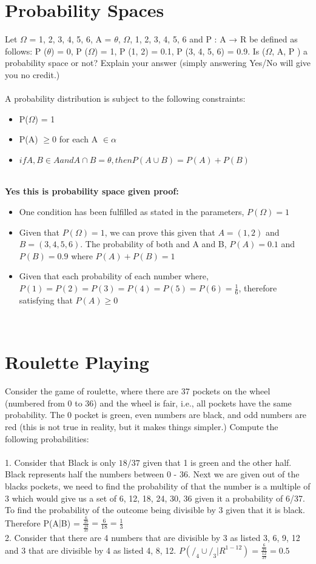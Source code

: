 \documentclass[12pt,letterpaper]{article}
\begin{document}
\section{Probability Spaces}
Let $\Omega$ = {1, 2, 3, 4, 5, 6}, A = {$\theta$, $\Omega$, {1, 2}, {3, 4, 5, 6}} and P : A → R be defined as follows:
P ($\theta$) = 0, P ($\Omega$) = 1, P ({1, 2}) = 0.1, P ({3, 4, 5, 6}) = 0.9. Is ($\Omega$, A, P ) a probability space or not?
Explain your answer (simply answering Yes/No will give you no credit.)
\\
\\
A probability distribution is subject to the following constraints:
\begin{itemize}
    \item P($\Omega$) = 1
    \item P(A) $\ge 0$ for each A $\in \alpha$
    \item $if A, B \in A and A \cap B = \theta, then P(A \cup B) = P(A) + P(B)$
\end{itemize}
\leavevmode
\\
\textbf{Yes this is probability space given proof:}
\begin{itemize}
    \item One condition has been fulfilled as stated in the parameters, $P(\Omega) = 1$
    \item Given that $P(\Omega) = 1$, we can prove this given that $A = (1, 2)$ and $B = (3, 4, 5, 6)$. The probability of both and A and B, $P(A) = 0.1$ and $P(B) = 0.9$ where $P(A) + P(B) = 1$
    \item Given that each probability of each number where, $P({1}) = P({2}) = P({3}) = P({4}) = P({5}) = P({6}) = \frac{1}{6}$, therefore satisfying that $P(A) \ge 0$
\end{itemize}
\leavevmode\newline
\\
\section{Roulette Playing}
Consider the game of roulette, where there are 37 pockets on the wheel (numbered from 0 to 36) and the wheel is fair, i.e., all pockets have the same probability. The 0 pocket is green, even numbers are black, and odd numbers are red (this is not true in reality, but it makes things simpler.) Compute the following probabilities:
\\
\\
1. Consider that Black is only $18/37$ given that 1 is green and the other half. Black represents half the numbers between 0 - 36. Next we are given out of the blacks pockets, we need to find the probability of that the number is a multiple of 3 which would give us a set of {6, 12, 18, 24, 30, 36} given it a probability of 6/37. To find the probability of the outcome being divisible by 3 given that it is black. Therefore P(A$\vert$B) = $\frac{\frac{6}{37}}{\frac{18}{37}} = \frac{6}{18} = \frac{1}{3}$
\\
2. Consider that there are 4 numbers that are divisible by 3 as listed {3, 6, 9, 12} and 3 that are divisible by 4 as listed {4, 8, 12}. $P(/_{4}\cup/_{3}\vert R^{1-12}) = \frac{\frac{6}{37}}{\frac{12}{37}} = 0.5$
\\
\end{document}
